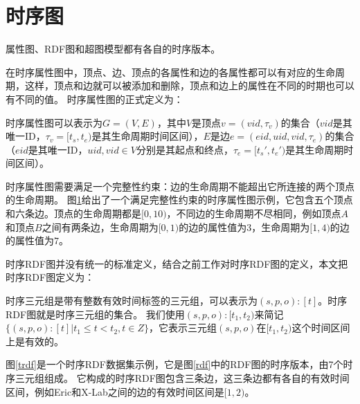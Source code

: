 \section{时序图}
属性图、RDF图和超图模型都有各自的时序版本。

在时序属性图中，顶点、边、顶点的各属性和边的各属性都可以有对应的生命周期，这样，顶点和边就可以被添加和删除，顶点和边上的属性在不同的时期也可以有不同的值。
时序属性图的正式定义为：

\begin{definition}[时序属性图]
  时序属性图可以表示为$G=(V,E)$，其中$V$是顶点$v=(vid, \tau_v)$的集合（$vid$是其唯一ID，$\tau_v=[t_s, t_e)$是其生命周期时间区间），$E$是边$e=(eid, uid, vid, \tau_e)$的集合（$eid$是其唯一ID，$uid, vid\in V$分别是其起点和终点，$\tau_e=[t_s', t_e')$是其生命周期时间区间）。
\end{definition}

时序属性图需要满足一个完整性约束：边的生命周期不能超出它所连接的两个顶点的生命周期。
图\ref{interval}给出了一个满足完整性约束的时序属性图示例，它包含五个顶点和六条边。顶点的生命周期都是$[0,10)$，不同边的生命周期不尽相同，例如顶点$A$和顶点$B$之间有两条边，生命周期为$[0,1)$的边的属性值为$3$，生命周期为$[1,4)$的边的属性值为$7$。

\begin{figure}[htb] 
\label{interval}
\end{figure}

时序RDF图并没有统一的标准定义，结合之前工作对时序RDF图的定义，本文把时序RDF图定义为：

\begin{definition}[时序RDF图]
  时序三元组是带有整数有效时间标签的三元组，可以表示为$(s,p,o):[t]$。时序RDF图就是时序三元组的集合。
  我们使用$(s,p,o):[t_1,t_2)$来简记$\{(s,p,o):[t]|t_1\leq t<t_2,t\in Z\}$，它表示三元组$(s,p,o)$在$[t_1,t_2)$这个时间区间上是有效的。
\end{definition}

图\ref{trdf}是一个时序RDF数据集示例，它是图\ref{rdf}中的RDF图的时序版本，由7个时序三元组组成。
它构成的时序RDF图包含三条边，这三条边都有各自的有效时间区间，例如Eric和X-Lab之间的边的有效时间区间是$[1,2)$。

